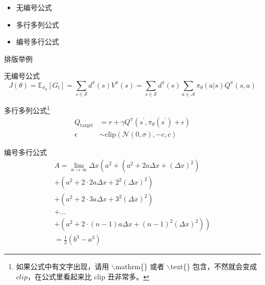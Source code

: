 \begin{frame}
    \begin{itemize}[<+-| alert@+>] %
        \item 无编号公式
        \item 多行多列公式
        \item 编号多行公式
    \end{itemize}
\end{frame}

\begin{frame}{排版举例}
    \begin{exampleblock}{无编号公式}
        \small
        \begin{equation*}
            J(\theta) = \mathbb{E}_{\pi_\theta}[G_t] = \sum_{s\in\mathcal{S}} d^\pi (s)V^\pi(s)=\sum_{s\in\mathcal{S}} d^\pi(s)\sum_{a\in\mathcal{A}}\pi_\theta(a|s)Q^\pi(s,a)
        \end{equation*}
    \end{exampleblock}
    \begin{exampleblock}{多行多列公式\footnote{如果公式中有文字出现，请用 $\backslash$mathrm\{\} 或者 $\backslash$text\{\} 包含，不然就会变成 $clip$，在公式里看起来比 $\mathrm{clip}$ 丑非常多。}}
        \begin{align}
            Q_\mathrm{target}&=r+\gamma Q^\pi(s^\prime, \pi_\theta(s^\prime)+\epsilon)\\
            \epsilon&\sim\mathrm{clip}(\mathcal{N}(0, \sigma), -c, c)\nonumber
        \end{align}
    \end{exampleblock}
\end{frame}

\begin{frame}
    \begin{exampleblock}{编号多行公式}
        \begin{multline}
            A=\lim_{n\rightarrow\infty}\Delta x\left(a^{2}+\left(a^{2}+2a\Delta x+\left(\Delta x\right)^{2}\right)\right.\label{eq:reset}\\
                +\left(a^{2}+2\cdot2a\Delta x+2^{2}\left(\Delta x\right)^{2}\right)\\
                +\left(a^{2}+2\cdot3a\Delta x+3^{2}\left(\Delta x\right)^{2}\right)\\
                +\ldots\\
            \left.+\left(a^{2}+2\cdot(n-1)a\Delta x+(n-1)^{2}\left(\Delta x\right)^{2}\right)\right)\\
            =\frac{1}{3}\left(b^{3}-a^{3}\right)
        \end{multline}
    \end{exampleblock}
\end{frame}

